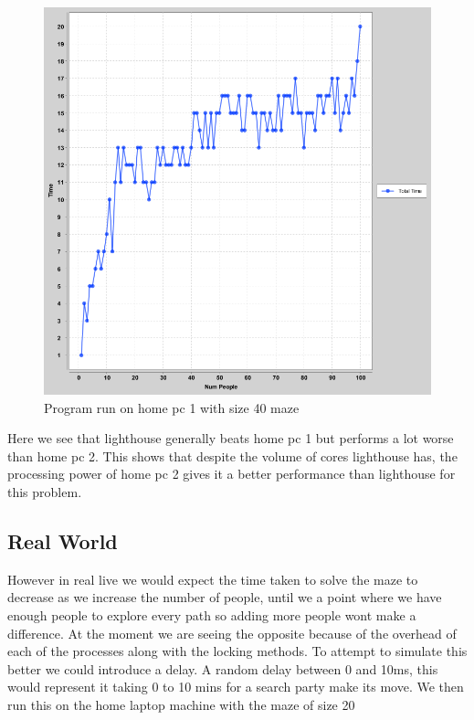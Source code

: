 \documentclass[a4paper, 12pt]{article}
\begin{document}
		\begin{figure}[H]
  				\includegraphics[width=\linewidth]{numpeople-vs-time(homepc1-big)}
  				\caption{Program run on home pc 1 with size 40 maze}
			\endminipage\hfill
		\end{figure}
		
		Here we see that lighthouse generally beats home pc 1 but performs a lot worse than home pc 2. This shows that despite the volume of cores lighthouse has, the processing power of home pc 2 gives it a better performance than lighthouse for this problem.
	
		\subsection{Real World}	
			However in real live we would expect the time taken to solve the maze to decrease as we increase the number of people, until we a point where we have enough people to explore every path so adding more people wont make a difference. At the moment we are seeing the opposite because of the overhead of each of the processes along with the locking methods. To attempt to simulate this better we could introduce a delay. A random delay between 0 and 10ms, this would represent it taking 0 to 10 mins for a search party make its move. We then run this on the home laptop machine with the maze of size 20
		
\end{document}
